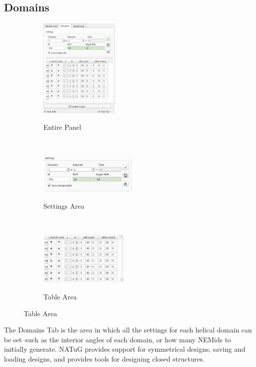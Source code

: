 \documentclass[
titlepage,
fontsize=12pt
]{article}
\begin{document}
	\subsection{Domains}
	
	\begin{figure}[h]
		\centering
		\caption{Domains Config Panel}
		\label{fig:domain-config-panel}
		
		\begin{subfigure}{.29\textwidth}
			\centering
			\includegraphics[height=1.9in]{domain-config-table.png}
			\label{fig:domain-config-table}
			\caption{Entire Panel}
		\end{subfigure}%
		~
		\begin{subfigure}{.29\textwidth}
			\centering
			\includegraphics[width=1.9in]{domains-settings.png}
			\label{fig:domain-config-table-settings}
			\caption{Settings Area}
		\end{subfigure}%
		~
		\begin{subfigure}{.29\textwidth}
			\centering
			\includegraphics[width=1.7in]{domains-table.png}
			\label{fig:domain-config-table-table}
			\caption{Table Area}
		\end{subfigure}
			
	\end{figure}

	The Domains Tab is the area in which all the settings for each helical domain can be set--such as the interior angles of each domain, or how many NEMids to initially generate. NATuG provides support for symmetrical designs, saving and loading designs, and provides tools for designing closed structures. 
	
\end{document}
